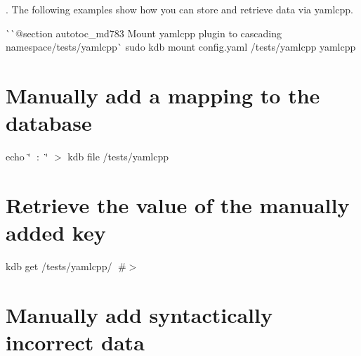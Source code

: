 . The following examples show how you can store and retrieve data via {\ttfamily yamlcpp}.

\`{}\`{}{\ttfamily  @section autotoc\+\_\+md783 Mount yamlcpp plugin to cascading namespace}/tests/yamlcpp\`{} sudo kdb mount config.\+yaml /tests/yamlcpp yamlcpp\hypertarget{autotoc_md780_autotoc_md784}{}\section{Manually add a mapping to the database}\label{autotoc_md780_autotoc_md784}
echo \char`\"{}🔑 \+: 🐳\char`\"{} $>$ {\ttfamily kdb file /tests/yamlcpp} \hypertarget{autotoc_md780_autotoc_md785}{}\section{Retrieve the value of the manually added key}\label{autotoc_md780_autotoc_md785}
kdb get /tests/yamlcpp/🔑 \#$>$ 🐳\hypertarget{autotoc_md780_autotoc_md786}{}\section{Manually add syntactically incorrect data}\label{autotoc_md780_autotoc_md786}
